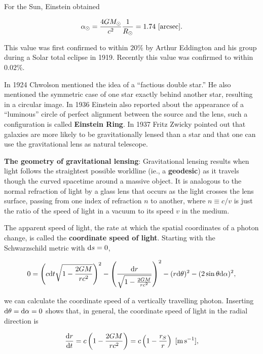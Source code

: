 \documentclass[a4paper,10pt]{article}
\begin{document}
{\noindent}For the Sun, Einstein obtained

\begin{align*}
    \alpha_\odot = \frac{4GM_\odot}{c^2}\frac{1}{R_\odot} = 1.74 ~ [{\rm arcsec}].
\end{align*}

{\noindent}This value was first confirmed to within $20\%$ by Arthur Eddington and his group during a Solar total eclipse in 1919. Recently this value was confirmed to within $0.02\%$.

{\noindent}In 1924 Chwolson mentioned the idea of a ``factious double star.'' He also mentioned the symmetric case of one star exactly behind another star, resulting in a circular image. In 1936 Einstein also reported about the appearance of a ``luminous'' circle of perfect alignment between the source and the lens, such a configuration is called \textbf{Einstein Ring}. In 1937 Fritz Zwicky pointed out that galaxies are more likely to be gravitationally lensed than a star and that one can use the gravitational lens as natural telescope.

{\noindent}\textbf{The geometry of gravitational lensing}: Gravitational lensing results when light follows the straightest possible worldline (ie., a \textbf{geodesic}) as it travels though the curved spacetime around a massive object. It is analogous to the normal refraction of light by a glass lens that occurs as the light crosses the lens surface, passing from one index of refraction $n$ to another, where $n\equiv c/v$ is just the ratio of the speed of light in a vacuum to its speed $v$ in the medium. 

{\noindent}The apparent speed of light, the rate at which the spatial coordinates of a photon change, is called the \textbf{coordinate speed of light}. Starting with the Schwarzschild metric with ${\rm d}s=0$,

\begin{align*}
    0 = \left(c{\rm d}t \sqrt{1-\frac{2GM}{rc^2}}\right)^2 - \left(\frac{{\rm d}r}{\sqrt{1-\frac{2GM}{rc^2}}}\right)^2 - (r{\rm d}\theta)^2 - (2\sin\theta{\rm d}\alpha)^2,
\end{align*}

{\noindent}we can calculate the coordinate speed of a vertically travelling photon. Inserting ${\rm d}\theta={\rm d}\alpha=0$ shows that, in general, the coordinate speed of light in the radial direction is

\begin{align*}
    \frac{{\rm d}r}{{\rm d}t} = c\left(1-\frac{2GM}{rc^2}\right) = c\left(1-\frac{r_S}{r}\right) ~ [{\rm m\,s^{-1}}],
\end{align*}
\end{document}
